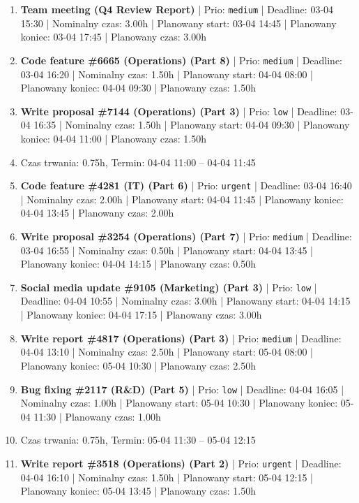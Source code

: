 {\begin{enumerate}
  \item [\textbf{14635}] \textbf{Team meeting (Q4 Review Report)} | Prio: \texttt{medium} | Deadline: 03-04 15:30 | Nominalny czas: 3.00h | Planowany start: 03-04 14:45 | Planowany koniec: 03-04 17:45 | Planowany czas: 3.00h
  \item [\textbf{14667}] \textbf{Code feature \#6665 (Operations) (Part 8)} | Prio: \texttt{medium} | Deadline: 03-04 16:20 | Nominalny czas: 1.50h | Planowany start: 04-04 08:00 | Planowany koniec: 04-04 09:30 | Planowany czas: 1.50h
  \item [\textbf{14702}] \textbf{Write proposal \#7144 (Operations) (Part 3)} | Prio: \texttt{low} | Deadline: 03-04 16:35 | Nominalny czas: 1.50h | Planowany start: 04-04 09:30 | Planowany koniec: 04-04 11:00 | Planowany czas: 1.50h
  \item [\textbf{PRZERWA}] Czas trwania: 0.75h, Termin: 04-04 11:00 -- 04-04 11:45
  \item [\textbf{14604}] \textbf{Code feature \#4281 (IT) (Part 6)} | Prio: \texttt{urgent} | Deadline: 03-04 16:40 | Nominalny czas: 2.00h | Planowany start: 04-04 11:45 | Planowany koniec: 04-04 13:45 | Planowany czas: 2.00h
  \item [\textbf{14663}] \textbf{Write proposal \#3254 (Operations) (Part 7)} | Prio: \texttt{medium} | Deadline: 03-04 16:55 | Nominalny czas: 0.50h | Planowany start: 04-04 13:45 | Planowany koniec: 04-04 14:15 | Planowany czas: 0.50h
  \item [\textbf{14698}] \textbf{Social media update \#9105 (Marketing) (Part 3)} | Prio: \texttt{low} | Deadline: 04-04 10:55 | Nominalny czas: 3.00h | Planowany start: 04-04 14:15 | Planowany koniec: 04-04 17:15 | Planowany czas: 3.00h
  \item [\textbf{14639}] \textbf{Write report \#4817 (Operations) (Part 3)} | Prio: \texttt{medium} | Deadline: 04-04 13:10 | Nominalny czas: 2.50h | Planowany start: 05-04 08:00 | Planowany koniec: 05-04 10:30 | Planowany czas: 2.50h
  \item [\textbf{14689}] \textbf{Bug fixing \#2117 (R\&D) (Part 5)} | Prio: \texttt{low} | Deadline: 04-04 16:05 | Nominalny czas: 1.00h | Planowany start: 05-04 10:30 | Planowany koniec: 05-04 11:30 | Planowany czas: 1.00h
  \item [\textbf{PRZERWA}] Czas trwania: 0.75h, Termin: 05-04 11:30 -- 05-04 12:15
  \item [\textbf{14598}] \textbf{Write report \#3518 (Operations) (Part 2)} | Prio: \texttt{urgent} | Deadline: 04-04 16:10 | Nominalny czas: 1.50h | Planowany start: 05-04 12:15 | Planowany koniec: 05-04 13:45 | Planowany czas: 1.50h

\end{enumerate}}
